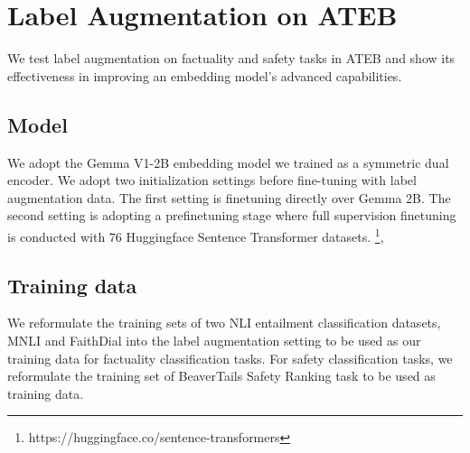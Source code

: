 \section{Label Augmentation on ATEB}
We test label augmentation on factuality and safety tasks in ATEB and show its effectiveness in improving an embedding model's advanced capabilities. 
\subsection{Model}
We adopt the Gemma V1-2B embedding model we trained as a symmetric dual encoder. We adopt two initialization settings before fine-tuning with label augmentation data. The first setting is finetuning directly over Gemma 2B. The second setting is adopting a prefinetuning stage where full supervision finetuning is conducted with 76 Huggingface Sentence Transformer datasets.  \footnote{https://huggingface.co/sentence-transformers}, 

\subsection{Training data}
We reformulate the training sets of two NLI entailment classification datasets, MNLI \citep{mnli} and FaithDial \citep{faithdial} into the label augmentation setting to be used as our training data for factuality classification tasks. For safety classification tasks, we reformulate the training set of BeaverTails Safety Ranking \citep{ji2023beavertails} task to be used as training data. 

